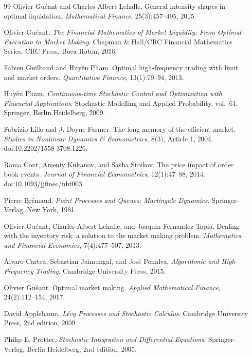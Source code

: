 \documentclass[11pt,a4paper]{article}
\theoremstyle{plain}
\theoremstyle{definition}
\begin{document}
\begin{thebibliography}{99}
Olivier Gu\'eant and Charles-Albert Lehalle.
General intensity shapes in optimal liquidation.
\emph{Mathematical Finance}, 25(3):457--495, 2015.

Olivier Gu\'eant.
\emph{The Financial Mathematics of Market Liquidity: From Optimal Execution to
Market Making}.
Chapman \& Hall/CRC Financial Mathematics Series. CRC Press, Boca Raton, 2016.

Fabien Guilbaud and Huy\^en Pham.
Optimal high-frequency trading with limit and market orders.
\emph{Quantitative Finance}, 13(1):79--94, 2013.

Huy\^en Pham.
\emph{Continuous-time Stochastic Control and Optimization with Financial
Applications}.
Stochastic Modelling and Applied Probability, vol.~61. Springer, Berlin
Heidelberg, 2009.

Fabrizio Lillo and J. Doyne Farmer.
The long memory of the efficient market.
\emph{Studies in Nonlinear Dynamics \& Econometrics}, 8(3), Article 1, 2004.
doi:10.2202/1558-3708.1226.

Rama Cont, Arseniy Kukanov, and Sasha Stoikov.
The price impact of order book events.
\emph{Journal of Financial Econometrics}, 12(1):47--88, 2014.
doi:10.1093/jjfinec/nbt003.

Pierre Br\'emaud.
\emph{Point Processes and Queues: Martingale Dynamics}.
Springer-Verlag, New York, 1981.

Olivier Gu\'eant, Charles-Albert Lehalle, and Joaquin Fernandez-Tapia.
Dealing with the inventory risk: a solution to the market making problem.
\emph{Mathematics and Financial Economics}, 7(4):477--507, 2013.

\'Alvaro Cartea, Sebastian Jaimungal, and Jos\'e Penalva.
\emph{Algorithmic and High-Frequency Trading}.
Cambridge University Press, 2015.

Olivier Gu\'eant.
Optimal market making.
\emph{Applied Mathematical Finance}, 24(2):112--154, 2017.

David Applebaum.
\emph{L\'evy Processes and Stochastic Calculus}.
Cambridge University Press, 2nd edition, 2009.

Philip E. Protter.
\emph{Stochastic Integration and Differential Equations}.
Springer-Verlag, Berlin Heidelberg, 2nd edition, 2005.


\end{thebibliography}
\end{document}
